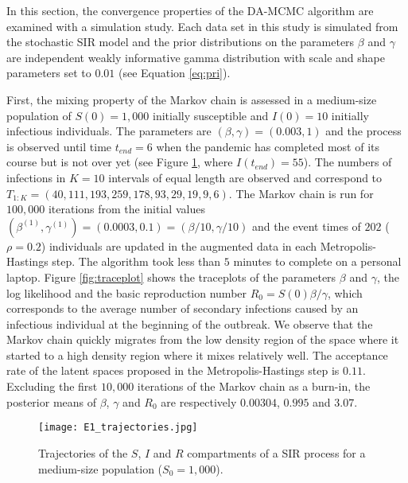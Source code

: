 \documentclass[11pt]{article}
\begin{document}
	In this section, the convergence properties of the DA-MCMC algorithm are examined with a simulation study. Each data set in this study is simulated from the stochastic SIR model and the prior distributions on the parameters $\beta$ and $\gamma$ are independent weakly informative gamma distribution with scale and shape parameters set to $0.01$ (see Equation \ref{eq:pri}).
	
	First, the mixing property of the Markov chain is assessed in a medium-size population of $S(0)=1,000$ initially susceptible and $I(0)=10$ initially infectious individuals. The parameters are $(\beta, \gamma) = (0.003, 1)$ and the process is observed until time $t_{end} = 6$ when the pandemic has completed most of its course but is not over yet (see Figure \ref{fig:long}, where $I(t_{end}) = 55$). The numbers of infections in $K = 10$ intervals of equal length are observed and correspond to $T_{1:K} = (40, 111, 193, 259, 178, 93, 29, 19, 9, 6)$. The Markov chain is run for $100,000$ iterations from the initial values $(\beta^{(1)}, \gamma^{(1)}) = (0.0003, 0.1) = (\beta/10, \gamma/10)$ and the event times of $202$ ($\rho = 0.2$) individuals are updated in the augmented data in each Metropolis-Hastings step. The algorithm took less than $5$ minutes to complete on a personal laptop. Figure \ref{fig:traceplot} shows the traceplots of the parameters $\beta$ and $\gamma$, the log likelihood and the basic reproduction number $R_0 = S(0) \beta / \gamma$, which corresponds to the average number of secondary infections caused by an infectious individual at the beginning of the outbreak. We observe that the Markov chain quickly migrates from the low density region of the space where it started to a high density region where it mixes relatively well. The acceptance rate of the latent spaces proposed in the Metropolis-Hastings step is $0.11$.
	Excluding the first $10,000$ iterations of the Markov chain as a burn-in, the posterior means of $\beta$, $\gamma$ and $R_0$ are respectively $0.00304$, $0.995$ and $3.07$.
	
			
	
	
	\begin{figure}
		\centering
		\texttt{[image: E1\_trajectories.jpg]}
		\caption{Trajectories of the $S$, $I$ and $R$ compartments of a SIR process for a medium-size population ($S_0 = 1,000$).}
		\label{fig:long}
	\end{figure}
	
\end{document}
